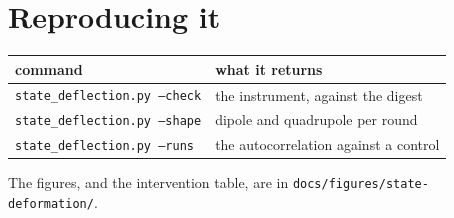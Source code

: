 \section{Reproducing it}

\begin{center}
\begin{tabular}{@{}ll@{}}
\toprule
command & what it returns \\
\midrule
\texttt{state\_deflection.py --check} & the instrument, against the digest \\
\texttt{state\_deflection.py --shape} & dipole and quadrupole per round \\
\texttt{state\_deflection.py --runs} & the autocorrelation against a control \\
\bottomrule
\end{tabular}
\end{center}

The figures, and the intervention table, are in \texttt{docs/\allowbreak{}figures/\allowbreak{}state-deformation/}.
